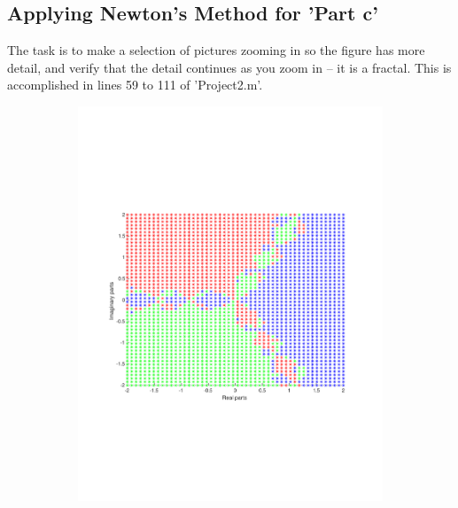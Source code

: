 \documentclass[12pt]{article} %
\begin{document}
        

     \subsection{Applying Newton's Method for 'Part c'}
   The task is to make a selection of pictures zooming in so the figure has more detail, and verify that the detail continues as you zoom in – it is a fractal. This is accomplished in lines 59 to 111 of 'Project2.m'.\par
   
   \begin{figure}[ht!]
    \centering
    \begin{subfigure}{0.35\textwidth}
        \includegraphics[width=\textwidth]{fig2.pdf}
        \caption{\small}
        \label{}
    \end{subfigure}
    \begin{subfigure}{0.35\textwidth}

\end{subfigure}
\end{figure}
\end{document}

